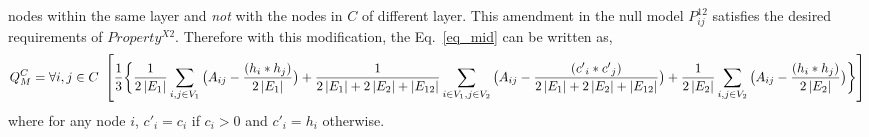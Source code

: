 nodes within the same layer and \emph{not} with the nodes in $C$ of different layer. This amendment in the null
model $P^{12}_{ij}$ satisfies the desired requirements of $Property^{X2}$. Therefore with this modification, the Eq.~\ref{eq_mid}
can be written as,
\vspace{-0.08in}
\begin{dmath}\label{eq_multi}
Q_M^C= {\forall i,j \in C}~  \left[ \frac{1}{3}\bigg \{
 \frac{1}{2\left \vert E_1 \right \vert}
 \sum_{i,j \in V_1}\big(A_{ij} - \frac{ (h_i * h_j)}{2\left \vert E_1 \right \vert}\big) +\\
 {\frac{1}{2\left \vert E_1 \right \vert + 2\left \vert E_2 \right \vert + \left \vert E_{12} \right \vert}
 \sum_{i \in V_1, j \in V_2}\big(A_{ij} - \frac{ ({c'}_i * {c'}_j)}
 {2\left \vert E_1 \right \vert + 2\left \vert E_2 \right \vert + \left \vert E_{12} \right \vert}\big)} +
 \frac{1}{2\left \vert E_{2} \right \vert}
 \sum_{i,j \in V_2}\big(A_{ij} - \frac{ (h_i * h_j)}{2\left \vert E_2 \right \vert}\big)
   \bigg \}\right]
\end{dmath}
\vspace{-0.08in}
where for any node $i$, ${c'}_i=c_i$ if $c_i > 0$ and ${c'}_i=h_i$ otherwise.

